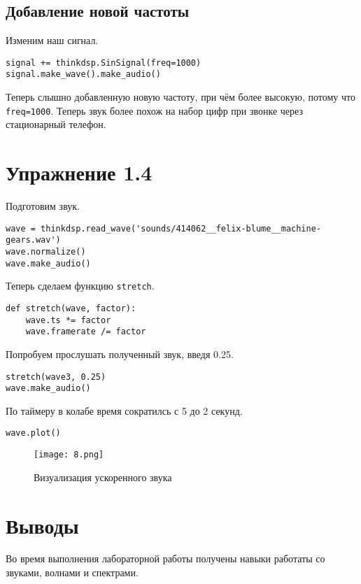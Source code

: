 \documentclass[a4paper,12pt]{report}
\begin{document}
\section{Добавление новой частоты}

Изменим наш сигнал.

\begin{lstlisting}[caption=Добавление новой частоты и воспроизведение]
signal += thinkdsp.SinSignal(freq=1000)
signal.make_wave().make_audio()
\end{lstlisting}

Теперь слышно добавленную новую частоту, при чём более высокую, потому что \texttt{freq=1000}. Теперь звук более похож на набор цифр при звонке через стационарный телефон.

\chapter{Упражнение 1.4}

Подготовим звук.

\begin{lstlisting}[caption=Загрузка и прослушивание звука]
wave = thinkdsp.read_wave('sounds/414062__felix-blume__machine-gears.wav')
wave.normalize()
wave.make_audio()
\end{lstlisting}

Теперь сделаем функцию \texttt{stretch}.

\begin{lstlisting}[caption=Функция stretch]
def stretch(wave, factor):
    wave.ts *= factor
    wave.framerate /= factor
\end{lstlisting}

Попробуем прослушать полученный звук, введя 0.25.

\begin{lstlisting}[caption=Прослушивание ускоренного звука]
stretch(wave3, 0.25)
wave.make_audio()
\end{lstlisting}

По таймеру в колабе время сократилсь с 5 до 2 секунд.

\begin{lstlisting}[caption=Визуализация ускоренного звука]
wave.plot()
\end{lstlisting}

\begin{figure}[H]
        \centering
        \texttt{[image: 8.png]}
        \caption{Визуализация ускоренного звука}
        \label{fig:fig4_1}
\end{figure}

\chapter{Выводы}

Во время выполнения лабораторной работы получены навыки работаты со звуками, волнами и спектрами.
\end{document}
